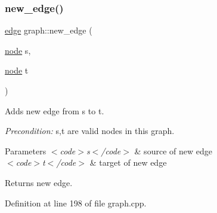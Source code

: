 \subsubsection{\texorpdfstring{new\+\_\+edge()}{new\_edge()}\hspace{0.1cm}{\footnotesize\ttfamily [1/2]}}
{\footnotesize\ttfamily \mbox{\hyperlink{classedge}{edge}} graph\+::new\+\_\+edge (\begin{DoxyParamCaption}\item[{\mbox{\hyperlink{classnode}{node}}}]{s,  }\item[{\mbox{\hyperlink{classnode}{node}}}]{t }\end{DoxyParamCaption})\hspace{0.3cm}{\ttfamily [virtual]}}

Adds new edge from {\ttfamily s} to {\ttfamily t}.

{\itshape Precondition\+:} {\ttfamily s,t} are valid nodes in this graph.


\begin{DoxyParams}{Parameters}
{\em $<$code$>$s$<$/code$>$} & source of new edge \\
\hline
{\em $<$code$>$t$<$/code$>$} & target of new edge \\
\hline
\end{DoxyParams}
\begin{DoxyReturn}{Returns}
new edge. 
\end{DoxyReturn}


Definition at line 198 of file graph.\+cpp.


